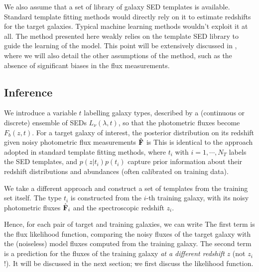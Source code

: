 \documentclass[aps,prd,showpacs,superscriptaddress,groupedaddress]{revtex4}  %
\begin{document}
We also assume that a set of library of galaxy SED templates is available. 
Standard template fitting methods would directly rely on it to estimate redshifts for the target galaxies. 
Typical machine learning methods wouldn't exploit it at all. 
The method presented here weakly relies on the template SED library to guide the learning of the model. 
This point will be extensively discussed in , where we will also detail the other assumptions of the method, such as the absence of significant biases in the flux measurements.


\subsection{Inference}

We introduce a variable $t$ labelling galaxy types, described by a (continuous or discrete) ensemble of SEDs $L_\nu(\lambda, t)$, so that the photometric fluxes become $F_b(z, t)$. 
For a target galaxy of interest, the posterior distribution on its redshift given noisy photometric flux measurements $\hat{\mat{F}}$ is
This is identical to the approach adopted in standard template fitting methods, where $t_i$ with $i=1, \cdots, N_T$ labels the SED templates, and $p(z | t_i) p(t_i)$ capture prior information about their redshift distributions and abundances (often calibrated on training data).
  
We take a different approach and construct a set of templates from the training set itself. 
The type $t_i$ is constructed from the $i$-th training galaxy, \ie with its noisy photometric fluxes $\hat{\mat{F}}_i$ and the spectroscopic redshift $z_i$. 

Hence, for each pair of target and training galaxies, we can write 
The first term is the flux likelihood function, comparing the noisy fluxes of the target galaxy with the (noiseless) model fluxes computed from the training galaxy. 
The second term is a prediction for the fluxes of the training galaxy {\it at a different redshift} $z$ (not $z_i$!). 
It will be discussed in the next section; we first discuss the likelihood function.
\end{document}
